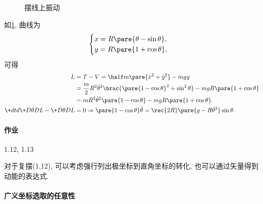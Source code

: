 \documentclass{ctexart}
\begin{document}
\begin{figure}[ht]
    \centering
    \caption{摆线上振动}
    \label{fig:摆线上振动}
\end{figure}
\begin{sample}
    \begin{ex}
        \label{ex:摆线上振动}
        如\cref{fig:摆线上振动}, 曲线为
        \[ \begin{cases}
            x = R\pare{\theta - \sin\theta}, \\
            y = R\pare{1+\cos\theta},
        \end{cases} \]
        可得
        \begin{align*}
            L &= T-V = \half m\pare{\dot{x}^2 + \dot{y}^2} - mgy \\
            &= \frac{m}{2} R^2\dot{\theta}^2 \brac{\pare{1-\cos\theta}^2 + \sin^2\theta} - mgR\pare{1+\cos\theta} \\
            &= mR^2\dot{\theta}^2\pare{1-\cos\theta} - mgR\pare{1+\cos\theta}. \\
            \+dtd{}\+D{\dot{\theta}}DL - \+D{\theta}D{L} & = 0 \Rightarrow \pare{1-\cos\theta}\ddot{\theta} = \rec{2R}\pare{g-R\dot{\theta}^2}\sin\theta.
        \end{align*}
    \end{ex}
\end{sample}

\paragraph{作业} %
\label{par:作业}

1.12, 1.13


\begin{remark}
    对于复摆(1,12), 可以考虑强行列出极坐标到直角坐标的转化, 也可以通过矢量得到动能的表达式.
\end{remark}

\paragraph{广义坐标选取的任意性} %
\label{par:广义坐标选取的任意性}
\end{document}
